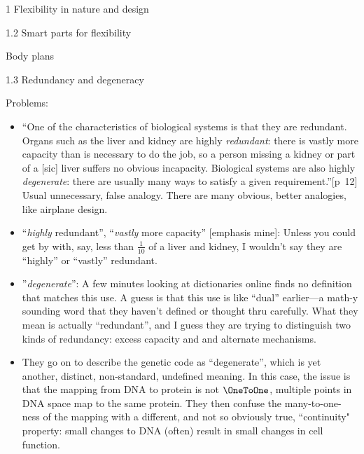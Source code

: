 \documentclass[12pt]{PalisadesLakesBook}
\begin{document}
\begin{plSection}{}
\begin{plSection}{1 Flexibility in nature and design}
\begin{plSection}{1.2 Smart parts for flexibility}
\begin{plSection}{Body plans}
\end{plSection}%
\end{plSection}%
\begin{plSection}{1.3 Redundancy and degeneracy}

Problems:
\begin{itemize}
  
  \item ``One of the characteristics of biological systems
is that they are redundant. 
Organs such as the liver and kidney are highly \emph{redundant}:
there is vastly more capacity than is necessary to do the job,
so a person missing a kidney or part of a [sic] liver suffers
no obvious incapacity.
Biological systems are also highly \emph{degenerate}:
there are usually many ways 
to satisfy a given requirement.''[p~12]
Usual unnecessary, false analogy.
  There are many obvious, better analogies, like airplane design.
  
  \item ``\emph{highly} redundant'',
  ``\emph{vastly} more capacity'' [emphasis mine]:
  Unless you could get by with, say,  less than $\frac{1}{10}$ 
  of a liver and kidney, I wouldn't say they are ``highly'' or
  ``vastly'' redundant.
  
  \item''\emph{degenerate}'': A few minutes looking at 
  dictionaries online finds no definition that matches this use.
  A guess is that this use is like ``dual'' earlier---a math-y
  sounding word that they haven't defined or thought thru
  carefully. What they mean is actually ``redundant'',
  and I guess they are trying to distinguish two kinds 
  of redundancy: excess capacity and and alternate mechanisms.
  
  \item They go on to describe the genetic code as ``degenerate'',
  which is yet another, distinct, non-standard, undefined meaning. 
  In this case, the issue is that
  the mapping from DNA to protein is not $\OneToOne$,
  multiple points in DNA space map to the same protein.
  They then confuse the many-to-one-ness of the mapping
  with a different, and not so obviously true, ``continuity" 
  property:
  small changes to DNA (often) result 
  in small changes in cell function.
  

\end{itemize}
\end{plSection}
\end{plSection}
\end{plSection}
\end{document}
